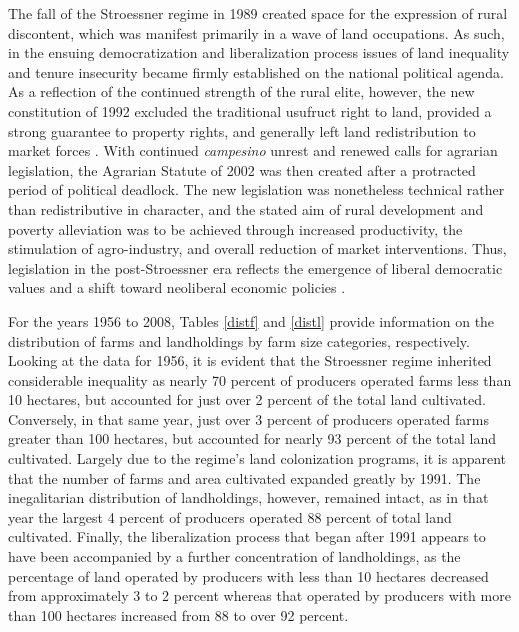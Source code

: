 \documentclass[english]{article}
\begin{document}
The fall of the Stroessner regime in 1989 created space for the expression of 
rural discontent, which was manifest primarily in a wave of land occupations.
As such, in the ensuing democratization and liberalization process issues of  
land inequality and tenure insecurity became firmly established on the national 
political agenda.
As a reflection of the continued strength of the rural elite, however, the new 
constitution of 1992 excluded the traditional usufruct right to land, provided a 
strong guarantee to property rights, and generally left land redistribution to 
market forces \citep{nagel1999, danielsen2009}.
With continued \emph{campesino} unrest and renewed calls for agrarian 
legislation, the Agrarian Statute of 2002 was then created after a protracted 
period of political deadlock.
The new legislation was nonetheless technical rather than redistributive in 
character, and the stated aim of rural development and poverty alleviation 
was to be achieved through increased productivity, the stimulation of
agro-industry, and overall reduction of market interventions.
Thus, legislation in the post-Stroessner era reflects the emergence of liberal 
democratic values and a shift toward neoliberal economic policies
\citep{danielsen2009}. 

For the years 1956 to 2008, Tables \ref{distf} and \ref{distl} provide 
information on the distribution of farms and landholdings by farm size 
categories, respectively. 
Looking at the data for 1956, it is evident that the Stroessner regime 
inherited considerable inequality as nearly 70 percent of producers 
operated farms less than 10 hectares, but accounted for just over 2 percent 
of the total land cultivated.
Conversely, in that same year, just over 3 percent of producers operated
farms greater than 100 hectares, but accounted for nearly 93 percent
of the total land cultivated.
Largely due to the regime's land colonization programs, it is apparent that 
the number of farms and area cultivated expanded greatly by 1991. 
The inegalitarian distribution of landholdings, however, remained intact, as in 
that year the largest 4 percent of producers operated 88 percent of total 
land cultivated.
Finally, the liberalization process that began after 1991 appears to have been
accompanied by a further concentration of landholdings, as the percentage of 
land operated by producers with less than 10 hectares decreased from 
approximately 3 to 2 percent whereas that operated by producers with more 
than 100 hectares increased from 88 to over 92 percent.
\end{document}
